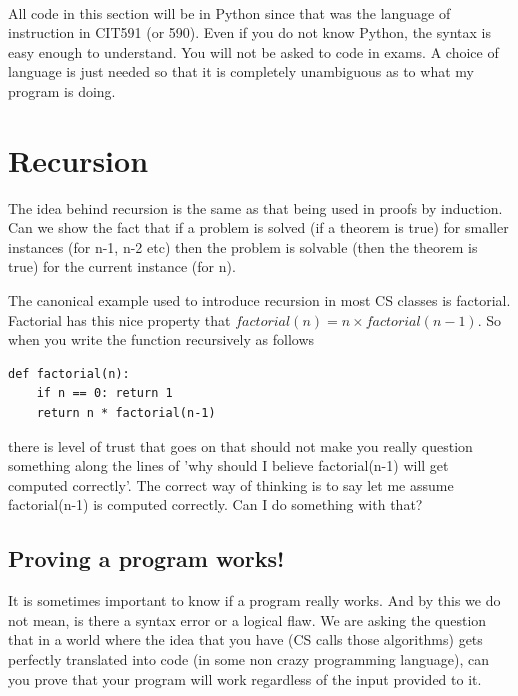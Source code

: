 \documentclass[12pt]{article}
\begin{document}
\begin{center}
\\
\vspace{1cm}
\end{center}

\vspace{0.5cm}\noindent

All code in this section will be in Python since that was the language of instruction in CIT591 (or 590). Even if you do not know Python, the syntax is easy enough to understand. You will not be asked to code in exams. A choice of language is just needed so that it is completely unambiguous as to what my program is doing.

\section*{Recursion}
The idea behind recursion is the same as that being used in proofs by induction. Can we show the fact that if a problem is solved (if a theorem is true) for smaller instances (for n-1, n-2 etc) then the problem is solvable (then the theorem is true) for the current instance (for n).

The canonical example used to introduce recursion in most CS classes is factorial. Factorial has this nice property that $factorial(n) = n \times factorial(n-1)$. So when you write the function recursively as follows

\begin{verbatim}
def factorial(n):
    if n == 0: return 1
    return n * factorial(n-1)
\end{verbatim}

there is level of trust that goes on that should not make you really question something along the lines of 'why should I believe factorial(n-1) will get computed correctly'. The correct way of thinking is to say let me assume factorial(n-1) is computed correctly. Can I do something with that?

\subsection*{Proving a program works!}

It is sometimes important to know if a program really works. And by this we do not mean, is there a syntax error or a logical flaw. We are asking the question that in a world where the idea that you have (CS calls those algorithms) gets perfectly translated into code (in some non crazy programming language), can you prove that your program will work regardless of the input provided to it.
\end{document}
